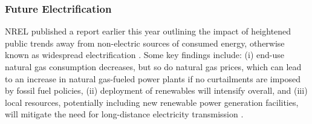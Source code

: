 \subsubsection{Future Electrification}\label{ch4:electrification_uncertainty}
NREL published a report earlier this year outlining the impact of heightened public trends away from non-electric sources of consumed energy, otherwise known as widespread electrification \citep{murphy_electrification_2021}. Some key findings include: (i) end-use natural gas consumption decreases, but so do natural gas prices, which can lead to an increase in natural gas-fueled power plants if no curtailments are imposed by fossil fuel policies, (ii) deployment of renewables will intensify overall, and (iii) local resources, potentially including new renewable power generation facilities, will mitigate the need for long-distance electricity transmission \citep{murphy_electrification_2021}.

